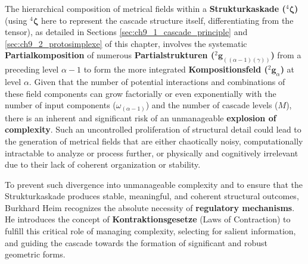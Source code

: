 \documentclass[
    12pt,              %
    a4paper,           %
    headings=normal,   %
    twoside=true,      %
    BCOR=8mm,          %
]{scrbook}
\newcommand{\kompositionsfeld}{{}^2\mathbf{g}}
\newcommand{\partialstruktur}[1]{{}^2\mathbf{g}_{(#1)}}
\newcommand{\kaskadenstufe}{\alpha}
\newcommand{\strukturkompressor}{{}^4\bm{\zeta}}
\begin{document}
The hierarchical composition of metrical fields within a \textbf{Strukturkaskade (\(\strukturkompressor\))} (using \(\strukturkompressor\) here to represent the cascade structure itself, differentiating from the tensor), as detailed in Sections \ref{sec:ch9_1_cascade_principle} and \ref{sec:ch9_2_protosimplexe} of this chapter, involves the systematic \textbf{Partialkomposition} of numerous \textbf{Partialstrukturen (\(\partialstruktur{(\alpha-1)(\gamma)}\))} from a preceding level \(\kaskadenstufe-1\) to form the more integrated \textbf{Kompositionsfeld (\(\kompositionsfeld_\alpha\))} at level \(\kaskadenstufe\). Given that the number of potential interactions and combinations of these field components can grow factorially or even exponentially with the number of input components (\(\omega_{(\alpha-1)}\)) and the number of cascade levels (\(M\)), there is an inherent and significant risk of an unmanageable \textbf{explosion of complexity}. Such an uncontrolled proliferation of structural detail could lead to the generation of metrical fields that are either chaotically noisy, computationally intractable to analyze or process further, or physically and cognitively irrelevant due to their lack of coherent organization or stability.

To prevent such divergence into unmanageable complexity and to ensure that the Strukturkaskade produces stable, meaningful, and coherent structural outcomes, Burkhard Heim recognizes the absolute necessity of \textbf{regulatory mechanisms}. He introduces the concept of \textbf{Kontraktionsgesetze} (Laws of Contraction) to fulfill this critical role of managing complexity, selecting for salient information, and guiding the cascade towards the formation of significant and robust geometric forms.
\end{document}
